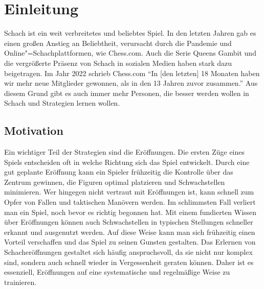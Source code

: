 
\chapter{Einleitung}

Schach ist ein weit verbreitetes und beliebtes Spiel. In den letzten Jahren gab es einen großen Anstieg an Beliebtheit, verursacht durch die Pandemie und Online"=Schachplattformen, wie Chess.com. Auch die Serie Queens Gambit und die vergrößerte Präsenz von Schach in sozialen Medien haben stark dazu beigetragen. Im Jahr 2022 schrieb Chess.com\: \enquote{In [den letzten] 18 Monaten haben wir mehr neue Mitglieder gewonnen, als in den 13 Jahren zuvor zusammen.} \cite{chesscom_chesscom_2022} Aus diesem Grund gibt es auch immer mehr Personen, die besser werden wollen in Schach und Strategien lernen wollen.

\section{Motivation}
Ein wichtiger Teil der Strategien sind die Eröffnungen. Die ersten Züge eines Spiels entscheiden oft in welche Richtung sich das Spiel entwickelt. Durch eine gut geplante Eröffnung kann ein Spieler frühzeitig die Kontrolle über das Zentrum gewinnen, die Figuren optimal platzieren und Schwachstellen minimieren. Wer hingegen nicht vertraut mit Eröffnungen ist, kann schnell zum Opfer von Fallen und taktischen Manövern werden. Im schlimmsten Fall verliert man ein Spiel, noch bevor es richtig begonnen hat. Mit einem fundierten Wissen über Eröffnungen können auch Schwachstellen in typischen Stellungen schneller erkannt und ausgenutzt werden. Auf diese Weise kann man sich frühzeitig einen Vorteil verschaffen und das Spiel zu seinen Gunsten gestalten. Das Erlernen von Schacheröffnungen gestaltet sich häufig anspruchsvoll, da sie nicht nur komplex sind, sondern auch schnell wieder in Vergessenheit geraten können. Daher ist es essenziell, Eröffnungen auf eine systematische und regelmäßige Weise zu trainieren.

